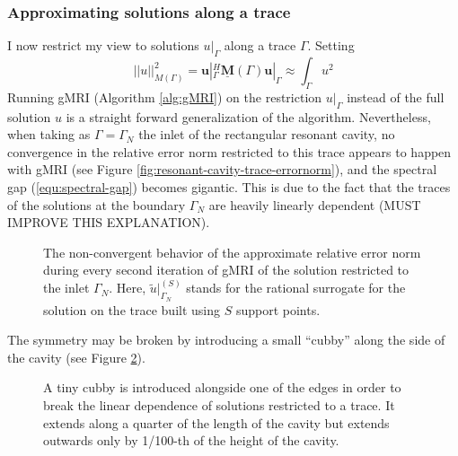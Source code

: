 \documentclass[11pt, a4paper]{article}
\begin{document}
\subsubsection{Approximating solutions along a trace}
\label{subsubsec:traces}

I now restrict my view to solutions $u|_{\Gamma}$ along a trace $\Gamma$. Setting
\begin{equation}
    ||u||_{M(\Gamma)}^2 = \mathbf{u}|_{\Gamma}^H \mathbf{\underline{M}}(\Gamma) \mathbf{u}|_{\Gamma}
        \approx \int_{\Gamma} u^2
\end{equation}
Running \acrshort{gMRI} (Algorithm \ref{alg:gMRI}) on the restriction $u|_{\Gamma}$
instead of the full solution $u$ is a straight forward generalization of the
algorithm. Nevertheless, when taking as $\Gamma = \Gamma_N$ the inlet of the
rectangular resonant cavity, no convergence in the relative error norm restricted
to this trace appears to happen with \acrshort{gMRI} (see Figure \ref{fig:resonant-cavity-trace-errornorm}),
and the spectral gap (\ref{equ:spectral-gap}) becomes gigantic.
This is due to the fact that the traces of the solutions at the boundary $\Gamma_N$
are heavily linearly dependent (MUST IMPROVE THIS EXPLANATION).

\begin{figure}[ht]
    \centering
    
    \caption{The non-convergent behavior of the approximate relative error norm
    during every second iteration of \acrshort{gMRI} of the solution
    restricted to the inlet $\Gamma_N$. Here, $\tilde{u}|_{\Gamma_N}^{(S)}$ stands 
    for the rational surrogate for the solution on the trace built using $S$
    support points.}
    \label{fig:rectangular-cavity-trace-errornorm}
\end{figure}

The symmetry may be broken by introducing a small \enquote{cubby} along the side
of the cavity (see Figure \ref{fig:rectangular-cavity-cubby}). 

\begin{figure}[h]
    \centering
    
    \caption{A tiny cubby is introduced alongside one of the edges in order to
    break the linear dependence of solutions restricted to a trace. It extends
    along a quarter of the length of the cavity but extends outwards only by
    1/100-th of the height of the cavity.}
    \label{fig:rectangular-cavity-cubby}
\end{figure}
\end{document}
